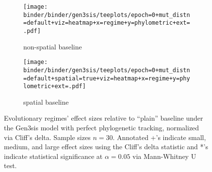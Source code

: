 \begin{figure*}
  \begin{subfigure}[b]{0.5\textwidth}
    \texttt{[image: binder/binder/gen3sis/teeplots/epoch=0+mut\_distn=default+viz=heatmap+x=regime+y=phylometric+ext=.pdf]}
    \caption{non-spatial baseline}
    \label{fig:perfect-tree-phylometrics-heatmap-gen3sis}
  \end{subfigure}%
  \begin{subfigure}[b]{0.5\textwidth}
    \texttt{[image: binder/binder/gen3sis/teeplots/epoch=0+mut\_distn=default+spatial=true+viz=heatmap+x=regime+y=phylometric+ext=.pdf]}
    \caption{spatial baseline}
    \label{fig:perfect-tree-phylometrics-spatial-heatmap-gen3sis}
  \end{subfigure}
  \caption{%
    Evolutionary regimes' effect sizes relative to ``plain'' baseline under the Gen3sis model with perfect phylogenetic tracking, normalized via Cliff's delta.
    Sample sizes $n=30$.
    Annotated +'s indicate small, medium, and large effect sizes using the Cliff's delta statistic and *'s indicate statistical significance at $\alpha = 0.05$ via Mann-Whitney U test.
  }
  \label{fig:perfect-tree-phylometrics-gen3sis}
\end{figure*}
